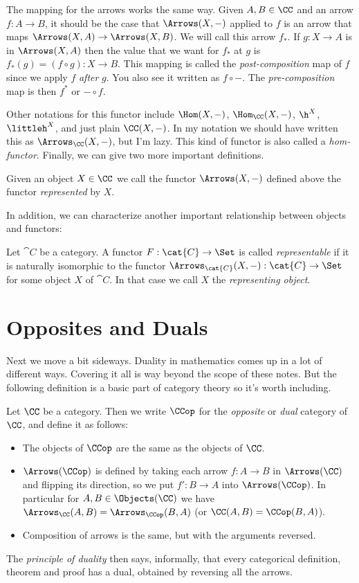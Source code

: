 The mapping for the arrows works the same way. Given $A,B \in
\CC$ and an arrow $f: A \to B$, it should be the case that $\Arrows(X,-)$ applied to $f$
is an arrow that maps $\Arrows(X,A) \to \Arrows(X,B)$. We will call this arrow $f_*$. If
$g: X \to A$ is in $\Arrows(X,A)$ then the value that we want for $f_*$ at $g$ is $f_*(g)
= (f \circ g): X \to B$. This mapping is called the {\it post-composition} map of $f$
since we apply $f$ {\it after} $g$. You also see it written as $f \circ -$. The {\it
pre-composition} map is then $f^*$ or $- \circ f$.

Other notations for this functor include $\Hom(X, -)$, $\Hom_\CC(X, -)$, $\h^X$, ${\littleh}^X$, and
just plain $\CC(X,-)$. In my notation we should have written this as $\Arrows_{\CC}(X,
-)$, but I'm lazy. This kind of functor is also called a {\it hom-functor}.
\goodbreak
Finally, we can give two more important definitions.
\begin{defn}
\label{represented}
Given an object $X \in \CC$ we call the functor $\Arrows(X,-)$ defined above the functor
{\it represented} by $X$.
\end{defn}
\noindent
In addition, we can characterize another important relationship between objects and
functors:

\begin{defn}
 Let $\cat{C}$ be a category. A functor $F:\cat{C}\to\Set$ is called \emph{representable}
 if it is naturally isomorphic to the functor $\Arrows_\cat{C}(X,-):\cat{C}\to\Set$ for
 some object $X$ of $\cat{C}$. In that case we call $X$ the \emph{representing object}. 
\end{defn}

\section{Opposites and Duals}

Next we move a bit sideways. Duality in mathematics comes up in
a lot of different ways. Covering it all is way beyond the scope of these notes. But the
following definition is a basic part of category theory so it's worth including.

\begin{defn}
Let $\CC$ be a category. Then we write $\CCop$ for the {\it opposite} or {\it dual}
category of $\CC$, and define it as follows:
\begin{itemize}
\item The objects of $\CCop$ are the same as the objects of $\CC$.
\item $\Arrows(\CCop)$ is defined by taking each arrow $f :A \to B$ in $\Arrows(\CC)$ and
flipping its direction, so we put $f': B \to A$ into $\Arrows(\CCop)$. In particular for
$A, B \in \Objects(\CC)$ we have $\Arrows_{\CC}(A, B) = \Arrows_{\CCop}(B, A)$ (or $\CC(A,
B) = \CCop(B, A)$).
\item Composition of arrows is the same, but with the arguments reversed.
\end{itemize}
\end{defn}
\noindent
The {\it principle of duality} then says, informally, that every categorical definition,
theorem and proof has a dual, obtained by reversing all the arrows.

